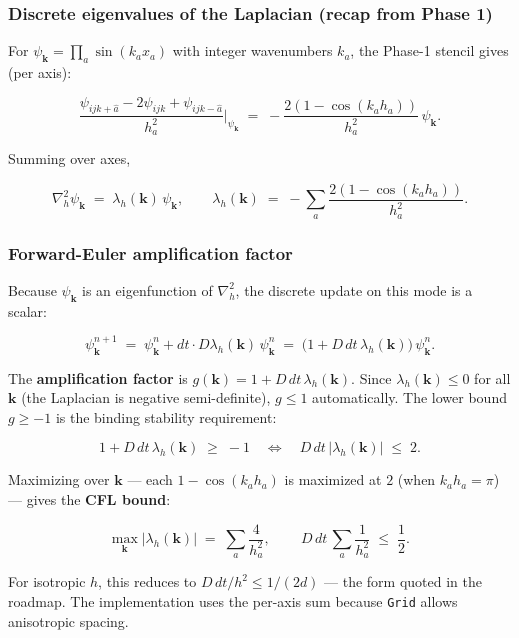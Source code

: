 \subsubsection{Discrete eigenvalues of the Laplacian (recap from Phase
1)}\label{discrete-eigenvalues-of-the-laplacian-recap-from-phase-1}

For \(\psi_{\mathbf{k}} = \prod_a \sin(k_a x_a)\) with integer
wavenumbers \(k_a\), the Phase-1 stencil gives (per axis):

\[
\frac{\psi_{ijk + \hat{a}} - 2 \psi_{ijk} + \psi_{ijk - \hat{a}}}{h_a^2}\Big|_{\psi_{\mathbf{k}}} \;=\; -\frac{2(1 - \cos(k_a h_a))}{h_a^2}\,\psi_{\mathbf{k}}.
\]

Summing over axes,

\[
\nabla^2_h \psi_{\mathbf{k}} \;=\; \lambda_h(\mathbf{k})\,\psi_{\mathbf{k}}, \qquad \lambda_h(\mathbf{k}) \;=\; -\sum_a \frac{2(1 - \cos(k_a h_a))}{h_a^2}.
\]

\subsubsection{Forward-Euler amplification
factor}\label{forward-euler-amplification-factor}

Because \(\psi_{\mathbf{k}}\) is an eigenfunction of \(\nabla^2_h\), the
discrete update on this mode is a scalar:

\[
\psi^{n+1}_{\mathbf{k}} \;=\; \psi^n_{\mathbf{k}} + dt \cdot D \lambda_h(\mathbf{k})\,\psi^n_{\mathbf{k}} \;=\; \bigl(1 + D\,dt\,\lambda_h(\mathbf{k})\bigr)\,\psi^n_{\mathbf{k}}.
\]

The \textbf{amplification factor} is
\(g(\mathbf{k}) = 1 + D\,dt\,\lambda_h(\mathbf{k})\). Since
\(\lambda_h(\mathbf{k}) \le 0\) for all \(\mathbf{k}\) (the Laplacian is
negative semi-definite), \(g \le 1\) automatically. The lower bound
\(g \ge -1\) is the binding stability requirement:

\[
1 + D\,dt\,\lambda_h(\mathbf{k}) \;\ge\; -1
\quad\Longleftrightarrow\quad
D\,dt\,|\lambda_h(\mathbf{k})| \;\le\; 2.
\]

Maximizing over \(\mathbf{k}\) --- each \(1 - \cos(k_a h_a)\) is
maximized at \(2\) (when \(k_a h_a = \pi\)) --- gives the \textbf{CFL
bound}:

\[
\max_{\mathbf{k}} |\lambda_h(\mathbf{k})| \;=\; \sum_a \frac{4}{h_a^2}, \qquad \boxed{\,D\,dt\,\sum_a \frac{1}{h_a^2} \;\le\; \frac{1}{2}.\,}
\]

For isotropic \(h\), this reduces to \(D\,dt/h^2 \le 1/(2d)\) --- the
form quoted in the roadmap. The implementation uses the per-axis sum
because \passthrough{\lstinline!Grid!} allows anisotropic spacing.


